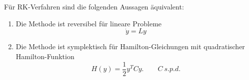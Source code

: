 \begin{satz}
	Für RK-Verfahren sind die folgenden Aussagen äquivalent:
	\begin{enumerate}[label=(\roman*)]
		\item Die Methode ist reversibel für lineare Probleme
		\begin{equation*}
			\dot y = Ly
		\end{equation*}
		\item Die Methode ist symplektisch für Hamilton-Gleichungen mit quadratischer Hamilton-Funktion
		\begin{equation*}
			H(y) = \frac{1}{2} y^TCy.\qquad C\ s.p.d.
		\end{equation*}
	\end{enumerate}
\end{satz}
